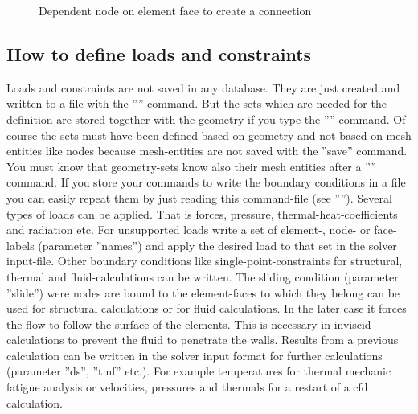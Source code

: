 \documentclass{article}
\begin{document}
\begin{appendix}
\begin{figure}[h]
\caption{\label{equation} Dependent node on element face to create a connection  }
\end{figure}


\subsection{\label{How to define loads and constraints}How to define loads and constraints}
Loads and constraints are not saved in any database. They are just created and written to a file with the '''' command. But the sets which are needed for the definition are stored together with the geometry if you type the '''' command. Of course the sets must have been defined based on geometry and not based on mesh entities like nodes because mesh-entities are not saved with the ''save'' command. You must know that geometry-sets know also their mesh entities after a '''' command.
If you store your commands to write the boundary conditions in a file you can easily repeat them by just reading this command-file (see ''''). Several types of loads can be applied. That is forces, pressure, thermal-heat-coefficients and radiation etc. For unsupported loads write a set of element-, node- or face-labels (parameter ''names'') and apply the desired load to that set in the solver input-file. Other boundary conditions like single-point-constraints for structural, thermal and fluid-calculations can be written. The sliding condition (parameter ''slide'') were nodes are bound to the element-faces to which they belong can be used for structural calculations or for fluid calculations. In the later case it forces the flow to follow the surface of the elements. This is necessary in inviscid calculations to prevent the fluid to penetrate the walls. Results from a previous calculation can be written in the solver input format for further calculations (parameter ''ds'', ''tmf'' etc.). For example temperatures for thermal mechanic fatigue analysis or velocities, pressures and thermals for a restart of a cfd calculation.



\end{appendix}
\end{document}
